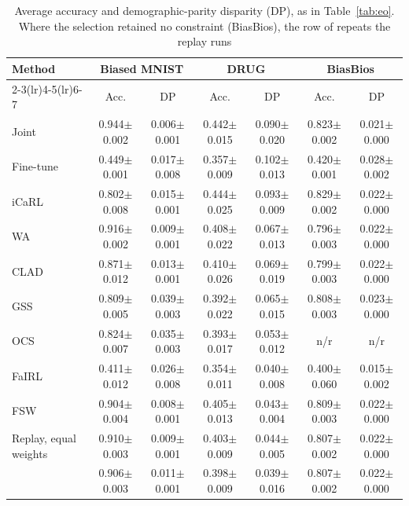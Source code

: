 \begin{table}[t]
\centering
\caption{Average accuracy and demographic-parity disparity (DP), as in Table~\ref{tab:eo}. Where the selection retained no constraint (BiasBios), the row of \method{} repeats the replay runs}\label{tab:dp}
\footnotesize
\setlength{\tabcolsep}{3pt}
\begin{tabular}{lcccccc}
\toprule
Method & \multicolumn{2}{c}{Biased MNIST} & \multicolumn{2}{c}{DRUG} & \multicolumn{2}{c}{BiasBios} \\
\cmidrule(lr){2-3}\cmidrule(lr){4-5}\cmidrule(lr){6-7}
 & Acc. & DP & Acc. & DP & Acc. & DP \\
\midrule
Joint & 0.944\tiny{$\pm$0.002} & 0.006\tiny{$\pm$0.001} & 0.442\tiny{$\pm$0.015} & 0.090\tiny{$\pm$0.020} & 0.823\tiny{$\pm$0.002} & 0.021\tiny{$\pm$0.000} \\
Fine-tune & 0.449\tiny{$\pm$0.001} & 0.017\tiny{$\pm$0.008} & 0.357\tiny{$\pm$0.009} & 0.102\tiny{$\pm$0.013} & 0.420\tiny{$\pm$0.001} & 0.028\tiny{$\pm$0.002} \\
\midrule
iCaRL & 0.802\tiny{$\pm$0.008} & 0.015\tiny{$\pm$0.001} & 0.444\tiny{$\pm$0.025} & 0.093\tiny{$\pm$0.009} & 0.829\tiny{$\pm$0.002} & 0.022\tiny{$\pm$0.000} \\
WA & 0.916\tiny{$\pm$0.002} & 0.009\tiny{$\pm$0.001} & 0.408\tiny{$\pm$0.022} & 0.067\tiny{$\pm$0.013} & 0.796\tiny{$\pm$0.003} & 0.022\tiny{$\pm$0.000} \\
CLAD & 0.871\tiny{$\pm$0.012} & 0.013\tiny{$\pm$0.001} & 0.410\tiny{$\pm$0.026} & 0.069\tiny{$\pm$0.019} & 0.799\tiny{$\pm$0.003} & 0.022\tiny{$\pm$0.000} \\
GSS & 0.809\tiny{$\pm$0.005} & 0.039\tiny{$\pm$0.003} & 0.392\tiny{$\pm$0.022} & 0.065\tiny{$\pm$0.015} & 0.808\tiny{$\pm$0.003} & 0.023\tiny{$\pm$0.000} \\
OCS & 0.824\tiny{$\pm$0.007} & 0.035\tiny{$\pm$0.003} & 0.393\tiny{$\pm$0.017} & 0.053\tiny{$\pm$0.012} & n/r & n/r \\
FaIRL & 0.411\tiny{$\pm$0.012} & 0.026\tiny{$\pm$0.008} & 0.354\tiny{$\pm$0.011} & 0.040\tiny{$\pm$0.008} & 0.400\tiny{$\pm$0.060} & 0.015\tiny{$\pm$0.002} \\
FSW \cite{park2026fsw} & 0.904\tiny{$\pm$0.004} & 0.008\tiny{$\pm$0.001} & 0.405\tiny{$\pm$0.013} & 0.043\tiny{$\pm$0.004} & 0.809\tiny{$\pm$0.003} & 0.022\tiny{$\pm$0.000} \\
\midrule
Replay, equal weights & 0.910\tiny{$\pm$0.003} & 0.009\tiny{$\pm$0.001} & 0.403\tiny{$\pm$0.009} & 0.044\tiny{$\pm$0.005} & 0.807\tiny{$\pm$0.002} & 0.022\tiny{$\pm$0.000} \\
\method{} & 0.906\tiny{$\pm$0.003} & 0.011\tiny{$\pm$0.001} & 0.398\tiny{$\pm$0.009} & 0.039\tiny{$\pm$0.016} & 0.807\tiny{$\pm$0.002} & 0.022\tiny{$\pm$0.000} \\
\bottomrule
\end{tabular}
\end{table}
